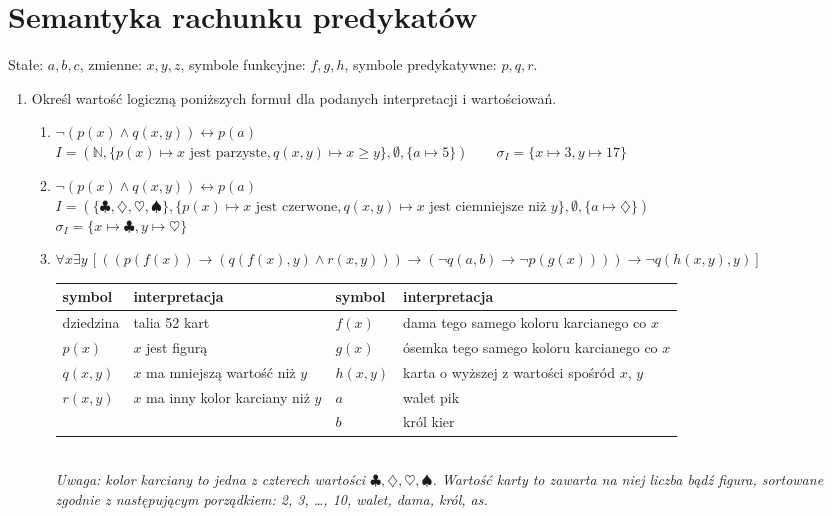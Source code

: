 \documentclass{mwart}
\renewcommand{\iff}{\ensuremath\leftrightarrow}
\renewcommand{\iff}{\leftrightarrow}
\begin{document}
\section*{Semantyka rachunku predykatów}
Stałe: $a, b, c$, zmienne: $x, y, z$, symbole funkcyjne: $f, g, h$, symbole predykatywne: $p, q, r$.

\begin{enumerate}
	\item Określ wartość logiczną poniższych formuł dla podanych interpretacji i wartościowań.
		\begin{enumerate}
			\item $\lnot(p(x) \land q(x, y)) \iff p(a)$\\
			$I=\left(\mathbb{N}, \{p(x)\mapsto x \text{ jest parzyste}, q(x, y)\mapsto x\geq y\}, \emptyset, \{a\mapsto 5\}\right) \qquad \sigma_I=\{x\mapsto 3, y\mapsto 17\}$
			\item $\lnot(p(x) \land q(x, y)) \iff p(a)$\\
			$I=\left(\{\clubsuit, \diamondsuit, \heartsuit, \spadesuit\}, \{p(x)\mapsto x \text{ jest czerwone}, q(x, y)\mapsto x \text{ jest ciemniejsze niż } y\}, \emptyset, \{a\mapsto \diamondsuit\}\right)$\\
			$\sigma_I=\{x\mapsto \clubsuit, y\mapsto \heartsuit\}$	
			\item $\forall x\exists y\,\left[((p(f(x))\to(q(f(x), y)\land r(x, y)))\to(\lnot q(a, b)\to \lnot p(g(x))))\to \lnot q(h(x, y), y)\right]$\\
			\begin{tabular}{ll|ll}
			symbol & interpretacja & symbol & interpretacja \\
			\hline
			dziedzina & talia 52 kart & $f(x)$ & dama tego samego koloru karcianego co $x$ \\
			\cline{1-2}
			$p(x)$ & $x$ jest figurą & $g(x)$ & ósemka tego samego koloru karcianego co $x$ \\
			$q(x, y)$ & $x$ ma mniejszą wartość niż $y$ & $h(x, y)$ & karta o wyższej z wartości spośród $x$, $y$ \\
			\cline{3-4}
			$r(x, y)$ & $x$ ma inny kolor karciany niż $y$ & $a$ & walet pik \\			
			& & $b$ & król kier
			\end{tabular}\\
			\emph{Uwaga: kolor karciany to jedna z czterech wartości $\clubsuit, \diamondsuit, \heartsuit, \spadesuit$. Wartość karty to zawarta na niej liczba bądź figura, sortowane zgodnie z następującym porządkiem: 2, 3, \ldots, 10, walet, dama, król, as.}

\end{enumerate}
\end{enumerate}
\end{document}
